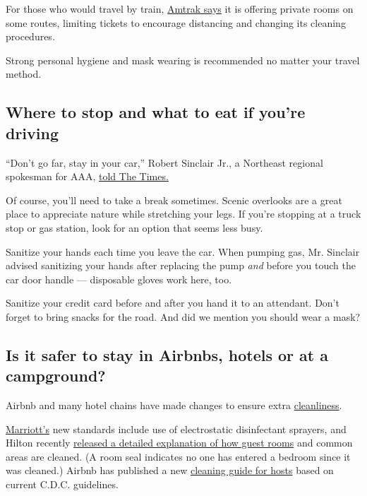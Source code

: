For those who would travel by train,
\href{https://www.amtrak.com/coronavirus}{Amtrak says} it is offering
private rooms on some routes, limiting tickets to encourage distancing
and changing its cleaning procedures.

Strong personal hygiene and mask wearing is recommended no matter your
travel method.

\hypertarget{where-to-stop-and-what-to-eat-if-youre-driving}{%
\subsection{Where to stop and what to eat if you're
driving}\label{where-to-stop-and-what-to-eat-if-youre-driving}}

``Don't go far, stay in your car,'' Robert Sinclair Jr., a Northeast
regional spokesman for AAA,
\href{https://www.nytimes.com/interactive/2020/world/coronavirus-tips-advice.html?action=click\&pgtype=Article\&state=default\&module=styln-coronavirus-national\&variant=show\&region=TOP_BANNER\&context=storylines_menu}{told
The Times.}

Of course, you'll need to take a break sometimes. Scenic overlooks are a
great place to appreciate nature while stretching your legs. If you're
stopping at a truck stop or gas station, look for an option that seems
less busy.

Sanitize your hands each time you leave the car. When pumping gas, Mr.
Sinclair advised sanitizing your hands after replacing the pump
\emph{and} before you touch the car door handle --- disposable gloves
work here, too.

Sanitize your credit card before and after you hand it to an attendant.
Don't forget to bring snacks for the road. And did we mention you should
wear a mask?

\hypertarget{is-it-safer-to-stay-in-airbnbs-hotels-or-at-a-campground}{%
\subsection{Is it safer to stay in Airbnbs, hotels or at a
campground?}\label{is-it-safer-to-stay-in-airbnbs-hotels-or-at-a-campground}}

Airbnb and many hotel chains have made changes to ensure extra
\href{https://www.nytimes.com/2020/06/03/travel/the-most-important-word-in-the-hospitality-industry-clean.html}{cleanliness}.

\href{https://news.marriott.com/news/2020/04/21/marriott-international-launches-global-cleanliness-council-to-promote-even-higher-standards-of-cleanliness-in-the-age-of-covid-19}{Marriott's}
new standards include use of electrostatic disinfectant sprayers, and
Hilton recently
\href{https://www.hilton.com/en/corporate/cleanstay/}{released a
detailed explanation of how guest rooms} and common areas are cleaned.
(A room seal indicates no one has entered a bedroom since it was
cleaned.) Airbnb has published a new
\href{https://www.airbnb.com/resources/hosting-homes/a/cleaning-guidelines-to-help-prevent-the-spread-of-covid-19-163}{cleaning
guide for hosts} based on current C.D.C. guidelines.

